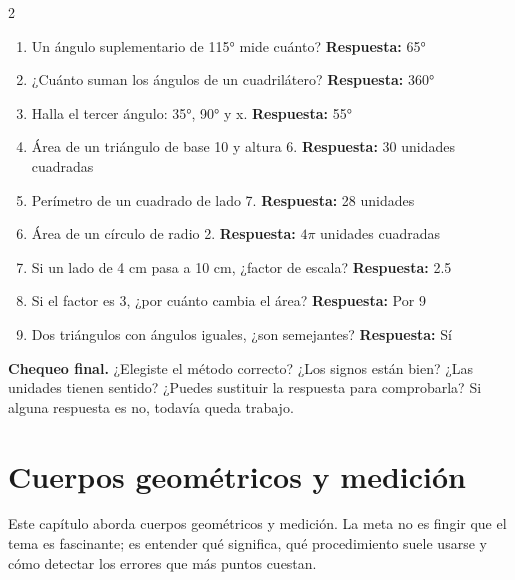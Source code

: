 \documentclass[10pt,oneside,openany]{book}
\begin{document}
\begin{multicols}{2}\begin{enumerate}

\item Un ángulo suplementario de 115° mide cuánto? \textbf{Respuesta:} 65°

\item ¿Cuánto suman los ángulos de un cuadrilátero? \textbf{Respuesta:} 360°

\item Halla el tercer ángulo: 35°, 90° y x. \textbf{Respuesta:} 55°

\item Área de un triángulo de base 10 y altura 6. \textbf{Respuesta:} 30 unidades cuadradas

\item Perímetro de un cuadrado de lado 7. \textbf{Respuesta:} 28 unidades

\item Área de un círculo de radio 2. \textbf{Respuesta:} $4\pi$ unidades cuadradas

\item Si un lado de 4 cm pasa a 10 cm, ¿factor de escala? \textbf{Respuesta:} 2.5

\item Si el factor es 3, ¿por cuánto cambia el área? \textbf{Respuesta:} Por 9

\item Dos triángulos con ángulos iguales, ¿son semejantes? \textbf{Respuesta:} Sí

\end{enumerate}\end{multicols}

\begin{idea}\textbf{Chequeo final.} ¿Elegiste el método correcto? ¿Los signos están bien? ¿Las unidades tienen sentido? ¿Puedes sustituir la respuesta para comprobarla? Si alguna respuesta es no, todavía queda trabajo.\end{idea}



\chapter{Cuerpos geométricos y medición}

\begin{idea}
Este capítulo aborda cuerpos geométricos y medición. La meta no es fingir que el tema es fascinante; es entender qué significa, qué procedimiento suele usarse y cómo detectar los errores que más puntos cuestan.
\end{idea}
\end{document}
